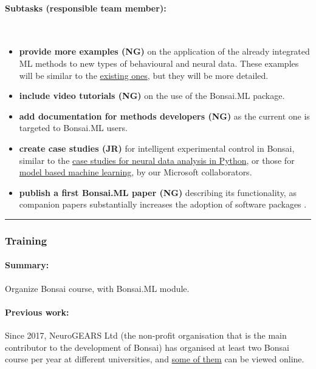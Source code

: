 \paragraph{Subtasks (responsible team member):}\mbox{}\\
\begin{itemize}

    \item\textbf{provide more examples (NG)} on the application of the already
        integrated ML methods to new types of behavioural and neural data.
        These examples will be similar to the
        \href{https://bonsai-rx.org/machinelearning/examples/README.html}{existing
        ones}, but they will be more detailed.

    \item\textbf{include video tutorials (NG)} on the use of the Bonsai.ML
        package.

    \item\textbf{add documentation for methods developers (NG)} as the current one is
        targeted to Bonsai.ML users.

    \item\textbf{create case studies (JR)} for intelligent experimental control
        in Bonsai, similar to the
        \href{https://mark-kramer.github.io/Case-Studies-Python/intro.html}{case
        studies for neural data analysis in Python}, or those for
        \href{https://mbmlbook.com/index.html}{model based machine learning},
        by our Microsoft collaborators.

    \item\textbf{publish a first Bonsai.ML paper (NG)} describing its functionality, as
        companion papers substantially increases the adoption of software
        packages \citep{lopesEtAl15,guilbeaultEtAl21}.

\end{itemize}

\noindent\rule{\textwidth}{1pt}
\subsubsection*{Training}

\paragraph{Summary:} Organize Bonsai course, with Bonsai.ML module.

\paragraph{Previous work:} Since 2017, NeuroGEARS Ltd (the non-profit
organisation that is the main contributor to the development of Bonsai) has
organised at least two Bonsai course per year at different universities, and
\href{https://bonsai-rx.org/learn/}{some of them} can be viewed
online.

